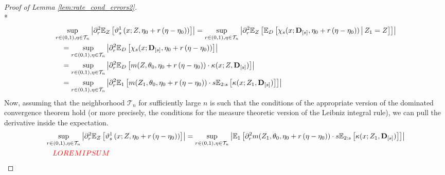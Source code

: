 \begin{proof}[Proof of Lemma \ref{lem:rate_cond_errors2}]\mbox{}\\*
    \begin{equation}
        \begin{aligned}
            & \sup_{r \in(0,1), \eta \in \mathcal{T}_{n}}\left|
                \partial_r^2 \mathbb{E}_{Z}\left[
                    \vartheta_{s}^{1}\left(x; Z, \eta_{0} + r\left(\eta-\eta_{0}\right)\right)
                \right]
            \right| 
            = \sup_{r \in(0,1), \eta \in \mathcal{T}_{n}}\left|
                \partial_r^2 \mathbb{E}_{Z}\left[
                    \mathbb{E}_{D}\left[\chi_{s}(x; \mathbf{D}_{[s]}, \eta_{0} + r\left(\eta-\eta_{0}\right)) \, \middle| \, Z_1 = Z\right]
                \right]
            \right| \\
            & \quad = \sup_{r \in(0,1), \eta \in \mathcal{T}_{n}}\left|
                \partial_r^2 \mathbb{E}_{D}\left[\chi_{s}(x; \mathbf{D}_{[s]}, \eta_{0} + r\left(\eta-\eta_{0}\right))\right]
            \right| \\
            & \quad =  \sup_{r \in(0,1), \eta \in \mathcal{T}_{n}}\left|
                \partial_r^2  \mathbb{E}_{D}\left[
                    m(Z, \theta_{0}, \eta_{0} + r\left(\eta-\eta_{0}\right)) \cdot \kappa(x; Z, \mathbf{D}_{[s]})
                \right]
            \right| \\
            & \quad =  \sup_{r \in(0,1), \eta \in \mathcal{T}_{n}}\left|
                \partial_r^2  \mathbb{E}_{1}\left[
                    m(Z_1, \theta_{0}, \eta_{0} + r\left(\eta-\eta_{0}\right)) \cdot s \mathbb{E}_{2:s}\left[\kappa(x; Z_{1}, \mathbf{D}_{[s]})\right]
                \right]
            \right|
        \end{aligned}
    \end{equation}
    Now, assuming that the neighborhood $\mathcal{T}_{n}$ for sufficiently large $n$ is such that the conditions of the appropriate version of the dominated convergence theorem hold (or more precisely, the conditions for the measure theoretic version of the Leibniz integral rule), we can pull the derivative inside the expectation.
    \begin{equation}
        \begin{aligned}
            & \sup_{r \in(0,1), \eta \in \mathcal{T}_{n}}\left|
                \partial_r^2 \mathbb{E}_{Z}\left[
                    \vartheta_{s}^{1}\left(x; Z, \eta_{0} + r\left(\eta-\eta_{0}\right)\right)
                \right]
            \right| 
            = \sup_{r \in(0,1), \eta \in \mathcal{T}_{n}}\left| \mathbb{E}_{1}\left[
                    \partial_r^2 m(Z_1, \theta_{0}, \eta_{0} + r\left(\eta-\eta_{0}\right)) \cdot s \mathbb{E}_{2:s}\left[\kappa(x; Z_{1}, \mathbf{D}_{[s]})\right]
                \right]
            \right| \\
            & \quad  {\color{red} LOREM IPSUM}
        \end{aligned}
    \end{equation}
    

\end{proof}
